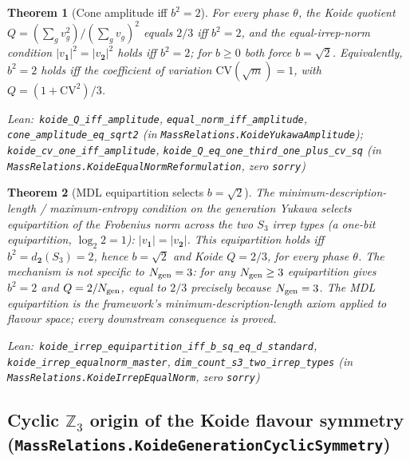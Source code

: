\documentclass[11pt,a4paper]{article}
\newenvironment{leanref}%
  {\par\smallskip\noindent\begingroup\raggedright\textup{Lean:}~}%
  {\par\endgroup}
\newtheorem{theorem}{Theorem}[section]
\theoremstyle{definition}
\begin{document}
\begin{theorem}[Cone amplitude iff $b^2 = 2$]\label{thm:koide-amp-iff}
For every phase $\theta$, the Koide quotient
$Q = (\sum_g v_g^2)/(\sum_g v_g)^2$ equals $2/3$ \emph{iff} $b^2 = 2$, and the
equal-irrep-norm condition $|v_{\mathbf 1}|^2 = |v_{\mathbf 2}|^2$ holds \emph{iff}
$b^2 = 2$; for $b \ge 0$ both force $b = \sqrt{2}$.  Equivalently, $b^2 = 2$
holds \emph{iff} the coefficient of variation $\mathrm{CV}(\sqrt{m}) = 1$, with
$Q = (1 + \mathrm{CV}^2)/3$.

\begin{leanref}\lstinline|koide_Q_iff_amplitude|,
\lstinline|equal_norm_iff_amplitude|,
\lstinline|cone_amplitude_eq_sqrt2|
\textup{(in \texttt{MassRelations.KoideYukawaAmplitude})};
\lstinline|koide_cv_one_iff_amplitude|,
\lstinline|koide_Q_eq_one_third_one_plus_cv_sq|
\textup{(in \texttt{MassRelations.KoideEqualNormReformulation}, zero \texttt{sorry})}\end{leanref}
\end{theorem}

\begin{theorem}[MDL equipartition selects $b = \sqrt{2}$]\label{thm:koide-equipartition}
The minimum-description-length / maximum-entropy condition on the generation
Yukawa selects equipartition of the Frobenius norm across the two $S_3$ irrep
types (a one-bit equipartition, $\log_2 2 = 1$): $|v_{\mathbf 1}| = |v_{\mathbf 2}|$.
This equipartition holds \emph{iff} $b^2 = d_{\mathbf 2}(S_3) = 2$, hence
$b = \sqrt{2}$ and Koide $Q = 2/3$, for every phase $\theta$.  The mechanism is
not specific to $N_{\rm gen} = 3$: for any $N_{\rm gen} \ge 3$ equipartition gives
$b^2 = 2$ and $Q = 2/N_{\rm gen}$, equal to $2/3$ precisely because $N_{\rm gen} = 3$.
The MDL equipartition is the framework's minimum-description-length axiom applied
to flavour space; every downstream consequence is proved.

\begin{leanref}\lstinline|koide_irrep_equipartition_iff_b_sq_eq_d_standard|,
\lstinline|koide_irrep_equalnorm_master|,
\lstinline|dim_count_s3_two_irrep_types|
\textup{(in \texttt{MassRelations.KoideIrrepEqualNorm}, zero \texttt{sorry})}\end{leanref}
\end{theorem}

\subsection{Cyclic $\mathbb{Z}_3$ origin of the Koide flavour symmetry (\texttt{MassRelations.KoideGenerationCyclicSymmetry})}\label{subsec:koide-cyclic-z3}
\end{document}
